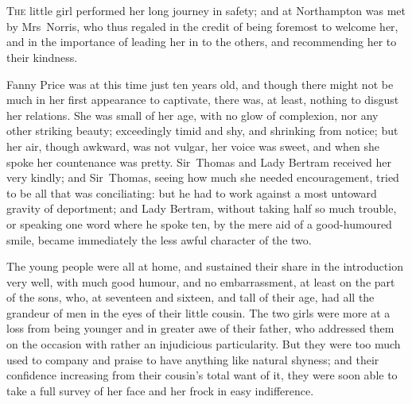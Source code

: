 \chapter[Chapter \thechapter]{} 

 \lettrine[lraise=0.3]{T}{he} little girl performed her long journey in safety; and at Northampton was met by Mrs~Norris, who thus regaled in the credit of being foremost to welcome her, and in the importance of leading her in to the others, and recommending her to their kindness.

Fanny Price was at this time just ten years old, and though there might not be much in her first appearance to captivate, there was, at least, nothing to disgust her relations. She was small of her age, with no glow of complexion, nor any other striking beauty; exceedingly timid and shy, and shrinking from notice; but her air, though awkward, was not vulgar, her voice was sweet, and when she spoke her countenance was pretty. Sir~Thomas and Lady Bertram received her very kindly; and Sir~Thomas, seeing how much she needed encouragement, tried to be all that was conciliating: but he had to work against a most untoward gravity of deportment; and Lady Bertram, without taking half so much trouble, or speaking one word where he spoke ten, by the mere aid of a good-humoured smile, became immediately the less awful character of the two.

The young people were all at home, and sustained their share in the introduction very well, with much good humour, and no embarrassment, at least on the part of the sons, who, at seventeen and sixteen, and tall of their age, had all the grandeur of men in the eyes of their little cousin. The two girls were more at a loss from being younger and in greater awe of their father, who addressed them on the occasion with rather an injudicious particularity. But they were too much used to company and praise to have anything like natural shyness; and their confidence increasing from their cousin's total want of it, they were soon able to take a full survey of her face and her frock in easy indifference.

